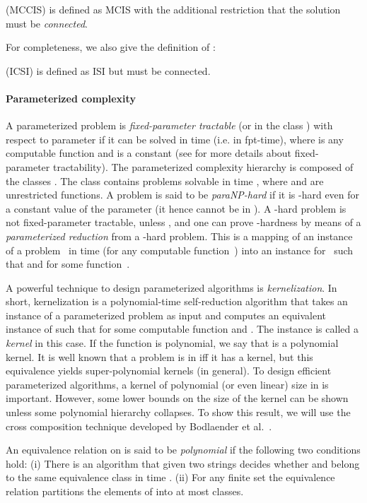 \mccis (MCCIS) is defined as MCIS with the additional restriction that the solution must be \emph{connected}. 

For completeness, we also give the definition of \isi:


\icsi (ICSI) is defined as ISI but  must be connected. 

\paragraph{Parameterized complexity}
A parameterized problem  is \textit{fixed-parameter tractable} (or in 
the class ) with respect to parameter  if it can be solved in 
 time (i.e. in fpt-time), where 
 is any computable function and  is a constant (see 
\cite{Downey2013,Niedermeier2006} 
for more details about fixed-parameter tractability).
The parameterized complexity hierarchy is composed of the classes 
. 
The class  contains problems solvable in time , 
where  and  are unrestricted functions.
A problem is said to be \emph{paraNP-hard} if it is -hard even for a 
constant value of the parameter (it hence cannot be in ).
A -hard problem is not fixed-parameter tractable, unless , and one can prove -hardness by means of a \emph{parameterized reduction} from a -hard problem.
This is a mapping of an instance~ of a problem~ in  time (for any computable function~) into an instance  for~ such that  and  for some function~.

A powerful technique to design parameterized algorithms is \textit{kernelization}.
In short, kernelization is a polynomial-time self-reduction algorithm that takes an instance  of a parameterized problem  as input and computes an equivalent instance  of  such that  for some computable function  and .
The instance  is called a \textit{kernel} in this case.
If the function  is polynomial, we say that  is a polynomial kernel.
It is well known that a problem is in  iff it has a kernel, but this equivalence yields super-polynomial kernels (in general).
To design efficient parameterized algorithms, a kernel of polynomial (or even linear) size in  is important.
However, some lower bounds on the size of the kernel can be shown unless some polynomial hierarchy collapses.
To show this result, we will use the cross composition technique developed by Bodlaender et al.~\cite{Bodlaender2014}.


\begin{definition}
  An equivalence relation  on  is said to be \emph{polynomial} if the following two conditions hold:
  (i) There is an algorithm that given two strings  decides whether  and  belong to the same equivalence class in time .
  (ii) For any finite set  the equivalence relation  partitions the elements of  into at most  classes.

\end{definition}

